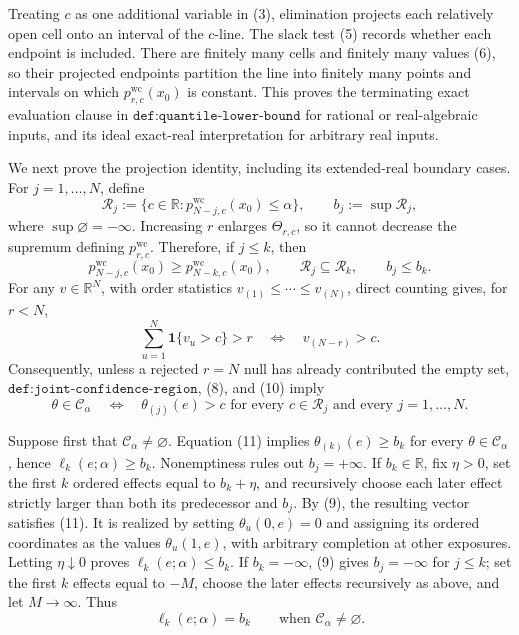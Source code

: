 Treating \(c\) as one additional variable in (3), elimination projects each relatively open cell onto an interval of the \(c\)-line.  The slack test (5) records whether each endpoint is included.  There are finitely many cells and finitely many values (6), so their projected endpoints partition the line into finitely many points and intervals on which \(p^{\mathrm{wc}}_{r,c}(x_0)\) is constant.  This proves the terminating exact evaluation clause in \(\texttt{def:quantile-lower-bound}\) for rational or real-algebraic inputs, and its ideal exact-real interpretation for arbitrary real inputs.

We next prove the projection identity, including its extended-real boundary cases.  For \(j=1,\ldots,N\), define
\[
 \mathcal R_j
 :=\{c\in\mathbb R:p^{\mathrm{wc}}_{N-j,c}(x_0)\leq\alpha\},
 \qquad b_j:=\sup\mathcal R_j,
\tag{8}
\]
where \(\sup\varnothing=-\infty\).  Increasing \(r\) enlarges \(\Theta_{r,c}\), so it cannot decrease the supremum defining \(p^{\mathrm{wc}}_{r,c}\).  Therefore, if \(j\leq k\), then
\[
 p^{\mathrm{wc}}_{N-j,c}(x_0)
 \geq p^{\mathrm{wc}}_{N-k,c}(x_0),
 \qquad \mathcal R_j\subseteq\mathcal R_k,
 \qquad b_j\leq b_k.
\tag{9}
\]
For any \(v\in\mathbb R^N\), with order statistics \(v_{(1)}\leq\cdots\leq v_{(N)}\), direct counting gives, for \(r<N\),
\[
 \sum_{u=1}^N\mathbf 1\{v_u>c\}>r
 \quad\Longleftrightarrow\quad
 v_{(N-r)}>c.
\tag{10}
\]
Consequently, unless a rejected \(r=N\) null has already contributed the empty set, \(\texttt{def:joint-confidence-region}\), (8), and (10) imply
\[
 \theta\in\mathcal C_\alpha
 \quad\Longleftrightarrow\quad
 \theta_{(j)}(e)>c
 \text{ for every }c\in\mathcal R_j
 \text{ and every }j=1,\ldots,N.
\tag{11}
\]

Suppose first that \(\mathcal C_\alpha\neq\varnothing\).  Equation (11) implies \(\theta_{(k)}(e)\geq b_k\) for every \(\theta\in\mathcal C_\alpha\), hence \(\ell_k(e;\alpha)\geq b_k\).  Nonemptiness rules out \(b_j=+\infty\).  If \(b_k\in\mathbb R\), fix \(\eta>0\), set the first \(k\) ordered effects equal to \(b_k+\eta\), and recursively choose each later effect strictly larger than both its predecessor and \(b_j\).  By (9), the resulting vector satisfies (11).  It is realized by setting \(\theta_u(0,e)=0\) and assigning its ordered coordinates as the values \(\theta_u(1,e)\), with arbitrary completion at other exposures.  Letting \(\eta\downarrow0\) proves \(\ell_k(e;\alpha)\leq b_k\).  If \(b_k=-\infty\), (9) gives \(b_j=-\infty\) for \(j\leq k\); set the first \(k\) effects equal to \(-M\), choose the later effects recursively as above, and let \(M\to\infty\).  Thus
\[
 \ell_k(e;\alpha)=b_k
 \qquad\text{when }\mathcal C_\alpha\neq\varnothing.
\tag{12}
\]

